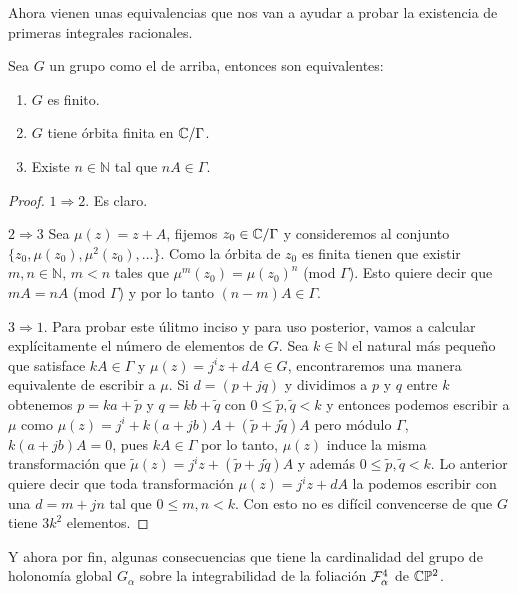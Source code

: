 Ahora vienen unas equivalencias que nos van a ayudar a probar la existencia de primeras integrales racionales.

\begin{Corolario}
\label{Coro:Equivalencias}
Sea $G$ un grupo como el de arriba, entonces son equivalentes:
\begin{enumerate}
\item $G$ es finito.
\item $G$ tiene órbita finita en $\mathbb{C}/\Gamma$.
\item Existe $n\in\mathbb{N}$ tal que $nA\in\Gamma$.
\end{enumerate}
\end{Corolario}
\begin{proof}
$1\Rightarrow 2$. Es claro.

\noindent $2\Rightarrow 3$ Sea $\mu(z)=z+A$, fijemos $z_{0}\in\mathbb{C}/\Gamma$ y consideremos al conjunto $\{z_{0},\mu(z_{0}),\mu^{2}(z_{0}),\ldots \}$. Como la órbita de $z_{0}$ es finita tienen que existir $m,n\in\mathbb{N},\, m<n$ tales que $\mu^{m}(z_{0})=\mu(z_{0})^{n}$ (mod $\Gamma$). Esto quiere decir que $mA=nA$ (mod $\Gamma$) y por lo tanto $(n-m)A\in\Gamma$.

\noindent $3\Rightarrow 1$. Para probar este úlitmo inciso y para uso posterior, vamos a calcular explícitamente el número de elementos de $G$. Sea $k\in\mathbb{N}$ el natural más pequeño que satisface $kA\in\Gamma$ y $\mu(z)=j^{i}z+dA\in G$, encontraremos una manera equivalente de escribir a $\mu$. Si $d=(p+jq)$ y dividimos a $p$ y $q$ entre $k$ obtenemos $p=ka +\tilde{p}$ y $q=kb+\tilde{q}$ con $0\leq\tilde{p},\tilde{q}<k$ y entonces podemos escribir a $\mu$ como $\mu(z)=j^{i}+k(a+jb)A+(\tilde{p}+j\tilde{q})A$ pero módulo $\Gamma$, $k(a+jb)A=0$, pues $kA\in\Gamma$ por lo tanto, $\mu(z)$ induce la misma transformación que $\tilde{\mu}(z)=j^{i}z+(\tilde{p}+j\tilde{q})A$ y además $0\leq\tilde{p},\tilde{q}<k$. Lo anterior quiere decir que toda transformación $\mu(z)=j^{i}z+dA$ la podemos escribir con una $d=m+jn$ tal que $0\leq m,n<k$. Con esto no es difícil convencerse de que $G$ tiene $3k^{2}$ elementos.
\end{proof}

Y ahora por fin, algunas consecuencias que tiene la cardinalidad del grupo de holonomía global $G_{\alpha}$ sobre la integrabilidad de la foliación $\mathcal{F}_{\alpha}^{4}$ de $\mathbb{C}\mathbb{P}^2$.

